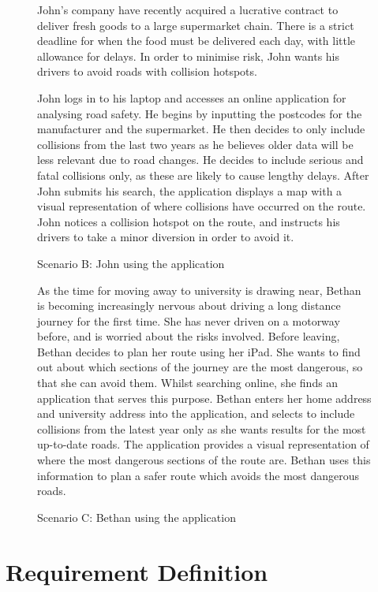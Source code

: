 \documentclass[authoryearcitations]{UoYCSproject}
\begin{document}
\begin{figure}
	\begin{framed}
 		John's company have recently acquired a lucrative contract to deliver fresh goods to a large supermarket chain. There is a strict deadline for when the food must be delivered each day, with little allowance for delays. In order to minimise risk, John wants his drivers to avoid roads with collision hotspots.
 		
 		John logs in to his laptop and accesses an online application for analysing road safety. He begins by inputting the postcodes for the manufacturer and the supermarket. He then decides to only include collisions from the last two years as he believes older data will be less relevant due to road changes. He decides to include serious and fatal collisions only, as these are likely to cause lengthy delays. After John submits his search, the application displays a map with a visual representation of where collisions have occurred on the route. John notices a collision hotspot on the route, and instructs his drivers to take a minor diversion in order to avoid it.
  	\end{framed}
  \caption{Scenario B: John using the application}
  \label{fig:scenarioB}
\end{figure}

\begin{figure}
	\begin{framed}
		As the time for moving away to university is drawing near, Bethan is becoming increasingly nervous about driving a long distance journey for the first time. She has never driven on a motorway before, and is worried about the risks involved. Before leaving, Bethan decides to plan her route using her iPad. She wants to find out about which sections of the journey are the most dangerous, so that she can avoid them. Whilst searching online, she finds an application that serves this purpose.
		Bethan enters her home address and university address into the application, and selects to include collisions from the latest year only as she wants results for the most up-to-date roads. The application provides a visual representation of where the most dangerous sections of the route are. Bethan uses this information to plan a safer route which avoids the most dangerous roads.
  	\end{framed}
  \caption{Scenario C: Bethan using the application}
  \label{fig:scenarioC}
\end{figure}

\section{Requirement Definition}
\end{document}
